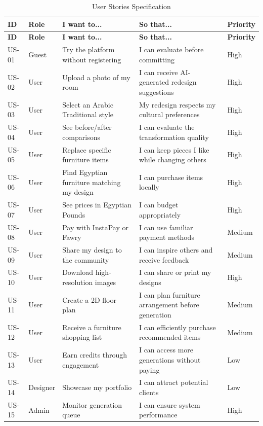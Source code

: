 \begin{longtable}{|p{1cm}|p{2cm}|p{4cm}|p{4.5cm}|p{1.5cm}|}
    \caption{User Stories Specification} \label{tab:user_stories} \\
    \hline
    \textbf{ID} & \textbf{Role} & \textbf{I want to...} & \textbf{So that...} & \textbf{Priority} \\
    \hline
    \endfirsthead
    \hline
    \textbf{ID} & \textbf{Role} & \textbf{I want to...} & \textbf{So that...} & \textbf{Priority} \\
    \hline
    \endhead
    \hline
    \endfoot
    
    US-01 & Guest & Try the platform without registering & I can evaluate before committing & High \\
    \hline
    US-02 & User & Upload a photo of my room & I can receive AI-generated redesign suggestions & High \\
    \hline
    US-03 & User & Select an Arabic Traditional style & My redesign respects my cultural preferences & High \\
    \hline
    US-04 & User & See before/after comparisons & I can evaluate the transformation quality & High \\
    \hline
    US-05 & User & Replace specific furniture items & I can keep pieces I like while changing others & High \\
    \hline
    US-06 & User & Find Egyptian furniture matching my design & I can purchase items locally & High \\
    \hline
    US-07 & User & See prices in Egyptian Pounds & I can budget appropriately & High \\
    \hline
    US-08 & User & Pay with InstaPay or Fawry & I can use familiar payment methods & Medium \\
    \hline
    US-09 & User & Share my design to the community & I can inspire others and receive feedback & Medium \\
    \hline
    US-10 & User & Download high-resolution images & I can share or print my designs & High \\
    \hline
    US-11 & User & Create a 2D floor plan & I can plan furniture arrangement before generation & Medium \\
    \hline
    US-12 & User & Receive a furniture shopping list & I can efficiently purchase recommended items & Medium \\
    \hline
    US-13 & User & Earn credits through engagement & I can access more generations without paying & Low \\
    \hline
    US-14 & Designer & Showcase my portfolio & I can attract potential clients & Low \\
    \hline
    US-15 & Admin & Monitor generation queue & I can ensure system performance & High \\
    \hline
\end{longtable}

